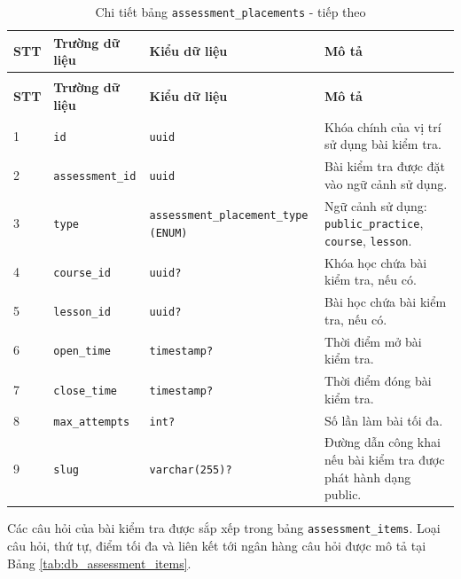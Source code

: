 \documentclass[../DoAn.tex]{subfiles}
\begin{document}
{\begin{longtable}{|p{}|p{}|p{}|p{}|}
\caption{Chi tiết bảng \texttt{assessment\_placements}}
\label{tab:db_assessment_placements}\\
\hline
\textbf{STT} & \textbf{Trường dữ liệu} & \textbf{Kiểu dữ liệu} & \textbf{Mô tả} \\ \hline
\endfirsthead
\caption[]{Chi tiết bảng \texttt{assessment\_placements} - tiếp theo}\\
\hline
\textbf{STT} & \textbf{Trường dữ liệu} & \textbf{Kiểu dữ liệu} & \textbf{Mô tả} \\ \hline
\endhead
1 & \texttt{id} & \texttt{uuid} & Khóa chính của vị trí sử dụng bài kiểm tra. \\ \hline
2 & \texttt{assessment\_id} & \texttt{uuid} & Bài kiểm tra được đặt vào ngữ cảnh sử dụng. \\ \hline
3 & \texttt{type} & \texttt{assessment\_placement\_type (ENUM)} & Ngữ cảnh sử dụng: \texttt{public\_practice}, \texttt{course}, \texttt{lesson}. \\ \hline
4 & \texttt{course\_id} & \texttt{uuid?} & Khóa học chứa bài kiểm tra, nếu có. \\ \hline
5 & \texttt{lesson\_id} & \texttt{uuid?} & Bài học chứa bài kiểm tra, nếu có. \\ \hline
6 & \texttt{open\_time} & \texttt{timestamp?} & Thời điểm mở bài kiểm tra. \\ \hline
7 & \texttt{close\_time} & \texttt{timestamp?} & Thời điểm đóng bài kiểm tra. \\ \hline
8 & \texttt{max\_attempts} & \texttt{int?} & Số lần làm bài tối đa. \\ \hline
9 & \texttt{slug} & \texttt{varchar(255)?} & Đường dẫn công khai nếu bài kiểm tra được phát hành dạng public. \\ \hline
\end{longtable}

Các câu hỏi của bài kiểm tra được sắp xếp trong bảng \texttt{assessment\_items}. Loại câu hỏi, thứ tự, điểm tối đa và liên kết tới ngân hàng câu hỏi được mô tả tại Bảng \ref{tab:db_assessment_items}.

}
\end{document}
